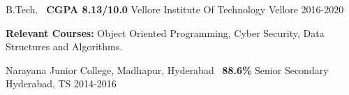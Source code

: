\begin{cventries}
  \cventry
    {B.Tech. \textbar\ \textbf{CGPA 8.13/10.0}}
    {Vellore Institute Of Technology}
    {Vellore}
    {2016-2020}
    {
      \begin{cvitems}
        \item {\textbf{Relevant Courses:} Object Oriented Programming, Cyber Security, Data Structures and Algorithms.}
      \end{cvitems}
    }
  \cventry
    {Narayana Junior College, Madhapur, Hyderabad \textbar\ \textbf{88.6\%}}
    { Senior Secondary }
    {Hyderabad, TS}
    {2014-2016}
    {}
\end{cventries}
